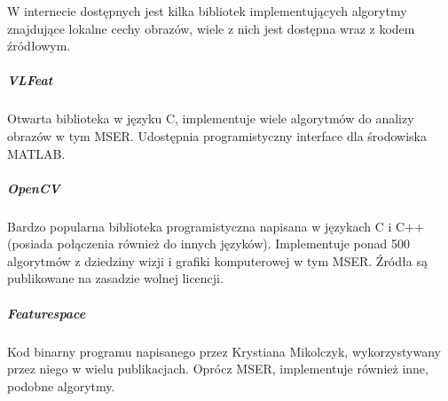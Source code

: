W internecie dostępnych jest kilka bibliotek implementujących algorytmy
znajdujące lokalne cechy obrazów, wiele z nich jest dostępna wraz z kodem
źródłowym.

\subparagraph{VLFeat \cite{vlfeat}}

Otwarta biblioteka w języku C, implementuje wiele algorytmów do analizy obrazów
w tym MSER. Udostępnia programistyczny interface dla środowiska MATLAB.

\subparagraph{OpenCV \cite{opencv}}

Bardzo popularna biblioteka programistyczna napisana w językach C i C++
(posiada połączenia również do innych języków). Implementuje ponad 500
algorytmów z dziedziny wizji i grafiki komputerowej w tym MSER. Źródła są
publikowane na zasadzie wolnej licencji.

\subparagraph{Featurespace \cite{featurespace}}

Kod binarny programu napisanego przez Krystiana Mikolczyk, wykorzystywany przez
niego w wielu publikacjach. Oprócz MSER, implementuje również inne, podobne
algorytmy.
